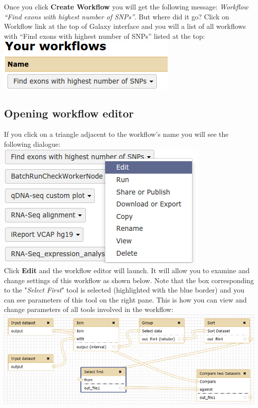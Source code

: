 \documentclass[11pt,a4paper]{article}
\begin{document}
Once you click \textbf{Create Workflow} you will get the following message: \textit{Workflow ``Find exons with highest number of SNPs''}. But where did it go? Click on Workflow link at the top of Galaxy interface and you will a list of all workflows with ``Find exons with highest number of SNPs'' listed at the top:\\
\includegraphics[scale=0.55]{figures/101_26}\\
\subsection{Opening workflow editor}
If you click on a triangle adjacent to the workflow's name you will see the following dialogue:\\
\includegraphics[scale=0.55]{figures/101_27}\\
Click \textbf{Edit} and the workflow editor will launch. It will allow you to examine and change settings of this workflow as shown below. Note that the box corresponding to the "\textit{Select First}" tool is selected (highlighted with the blue border) and you can see parameters of this tool on the right pane. This is how you can view and change parameters of all tools involved in the workflow:\\
\includegraphics[width=\textwidth]{figures/101_28}\\
\end{document}
